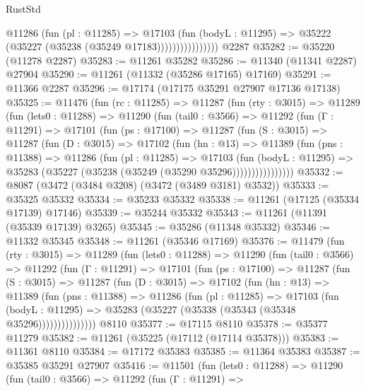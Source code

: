\begin{lexlean}{RustStd}
\begin{coremodule}
                        @11286
                          (fun (pl : @11285) =>
                          @17103
                            (fun (bodyL : @11295) =>
                            @35222 (@35227 (@35238 (@35249 @17183))))))))))))))))
    @2287
@35282 := @35220 (@11278 @2287)
@35283 := @11261 @35282
@35286 := @11340 (@11341 @2287) @27904
@35290 := @11261 (@11332 (@35286 @17165) @17169)
@35291 := @11366 @2287
@35296 := @17174 (@17175 @35291 @27907 @17136 @17138)
@35325 := @11476
    (fun (rc : @11285) =>
    @11287
      (fun (rty : @3015) =>
      @11289
        (fun (lets0 : @11288) =>
        @11290
          (fun (tail0 : @3566) =>
          @11292
            (fun (Γ : @11291) =>
            @17101
              (fun (ps : @17100) =>
              @11287
                (fun (S : @3015) =>
                @11287
                  (fun (D : @3015) =>
                  @17102
                    (fun (hn : @13) =>
                    @11389
                      (fun (pns : @11388) =>
                      @11286
                        (fun (pl : @11285) =>
                        @17103
                          (fun (bodyL : @11295) =>
                          @35283 (@35227 (@35238 (@35249 (@35290 @35296))))))))))))))))
@35332 := @8087 (@3472 (@3484 @3208) (@3472 (@3489 @3181) @3532))
@35333 := @35325 @35332
@35334 := @35233 @35332
@35338 := @11261 (@17125 (@35334 @17139) @17146)
@35339 := @35244 @35332
@35343 := @11261 (@11391 (@35339 @17139) @3265)
@35345 := @35286 (@11348 @35332)
@35346 := @11332 @35345
@35348 := @11261 (@35346 @17169)
@35376 := @11479
    (fun (rty : @3015) =>
    @11289
      (fun (lets0 : @11288) =>
      @11290
        (fun (tail0 : @3566) =>
        @11292
          (fun (Γ : @11291) =>
          @17101
            (fun (ps : @17100) =>
            @11287
              (fun (S : @3015) =>
              @11287
                (fun (D : @3015) =>
                @17102
                  (fun (hn : @13) =>
                  @11389
                    (fun (pns : @11388) =>
                    @11286
                      (fun (pl : @11285) =>
                      @17103
                        (fun (bodyL : @11295) =>
                        @35283 (@35227 (@35338 (@35343 (@35348 @35296)))))))))))))))
    @8110
@35377 := @17115 @8110
@35378 := @35377 @11279
@35382 := @11261 (@35225 (@17112 (@17114 @35378)))
@35383 := @11361 @8110
@35384 := @17172 @35383
@35385 := @11364 @35383
@35387 := @35385 @35291 @27907
@35416 := @11501
    (fun (lets0 : @11288) =>
    @11290
      (fun (tail0 : @3566) =>
      @11292
        (fun (Γ : @11291) =>

\end{coremodule}
\end{lexlean}
